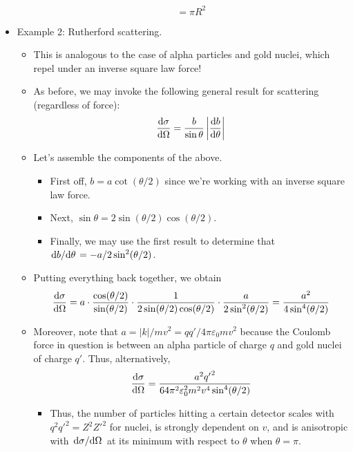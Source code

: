 \documentclass[../notes.tex]{subfiles}
\begin{document}
\begin{itemize}
\begin{itemize}
\begin{equation*}
            = \pi R^2
        \end{equation*}
    \end{itemize}
    \item Example 2: Rutherford scattering.
    \begin{itemize}
        \item This is analogous to the case of alpha particles and gold nuclei, which repel under an inverse square law force!
        \item As before, we may invoke the following general result for scattering (regardless of force):
        \begin{equation*}
            \dv{\sigma}{\Omega} = \frac{b}{\sin\theta}\left| \dv{b}{\theta} \right|
        \end{equation*}
        \item Let's assemble the components of the above.
        \begin{itemize}
            \item First off, $b=a\cot(\theta/2)$ since we're working with an inverse square law force.
            \item Next, $\sin\theta=2\sin(\theta/2)\cos(\theta/2)$.
            \item Finally, we may use the first result to determine that $\dv*{b}{\theta}=-a/2\sin^2(\theta/2)$.
        \end{itemize}
        \item Putting everything back together, we obtain
        \begin{equation*}
            \dv{\sigma}{\Omega} = a\cdot\frac{\cos(\theta/2)}{\sin(\theta/2)}\cdot\frac{1}{2\sin(\theta/2)\cos(\theta/2)}\cdot\frac{a}{2\sin^2(\theta/2)}
            = \frac{a^2}{4\sin^4(\theta/2)}
        \end{equation*}
        \item Moreover, note that $a=|k|/mv^2=qq'/4\pi\varepsilon_0mv^2$ because the Coulomb force in question is between an alpha particle of charge $q$ and gold nuclei of charge $q'$. Thus, alternatively,
        \begin{equation*}
            \dv{\sigma}{\Omega} = \frac{a^2{q'}^2}{64\pi^2\varepsilon_0^2m^2v^4\sin^4(\theta/2)}
        \end{equation*}
        \begin{itemize}
            \item Thus, the number of particles hitting a certain detector scales with $q^2{q'}^2=Z^2{Z'}^2$ for nuclei, is strongly dependent on $v$, and is anisotropic with $\dv*{\sigma}{\Omega}$ at its minimum with respect to $\theta$ when $\theta=\pi$.

\end{itemize}
\end{itemize}
\end{itemize}
\end{document}
